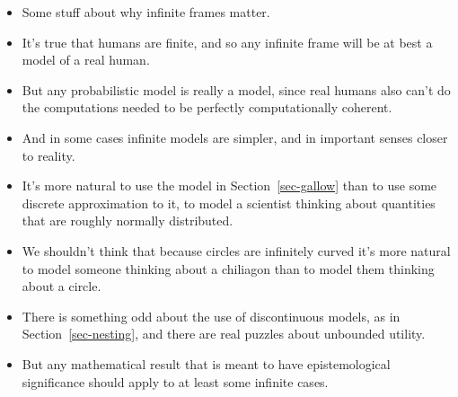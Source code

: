 \documentclass[
  10pt,
  letterpaper,
  DIV=11,
  numbers=noendperiod,
  twoside]{scrartcl}
\providecommand{\tightlist}{%
  \setlength{\itemsep}{0pt}\setlength{\parskip}{0pt}}\usepackage{longtable,booktabs,array}
\begin{document}
\begin{itemize}
\tightlist
\item
  Some stuff about why infinite frames matter.
\item
  It's true that humans are finite, and so any infinite frame will be at
  best a model of a real human.
\item
  But any probabilistic model is really a model, since real humans also
  can't do the computations needed to be perfectly computationally
  coherent.
\item
  And in some cases infinite models are simpler, and in important senses
  closer to reality.
\item
  It's more natural to use the model in Section~\ref{sec-gallow} than to
  use some discrete approximation to it, to model a scientist thinking
  about quantities that are roughly normally distributed.
\item
  We shouldn't think that because circles are infinitely curved it's
  more natural to model someone thinking about a chiliagon than to model
  them thinking about a circle.
\item
  There is something odd about the use of discontinuous models, as in
  Section~\ref{sec-nesting}, and there are real puzzles about unbounded
  utility.
\item
  But any mathematical result that is meant to have epistemological
  significance should apply to at least some infinite cases.
\end{itemize}
\end{document}

